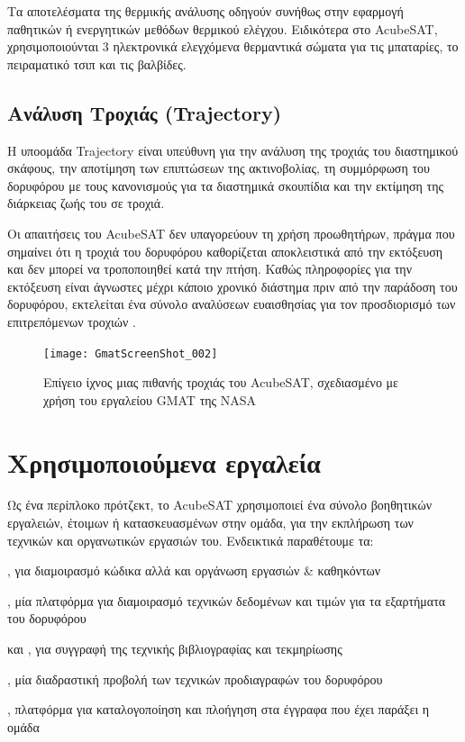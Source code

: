 \documentclass[a4paper,nobib]{tufte-book}
\begin{document}
Τα αποτελέσματα της θερμικής ανάλυσης οδηγούν συνήθως στην εφαρμογή παθητικών ή ενεργητικών μεθόδων θερμικού ελέγχου. Ειδικότερα στο AcubeSAT, χρησιμοποιούνται 3 ηλεκτρονικά ελεγχόμενα θερμαντικά σώματα για τις μπαταρίες, το πειραματικό τσιπ και τις βαλβίδες.

\subsection{Ανάλυση Τροχιάς (Trajectory)}

Η υποομάδα Trajectory είναι υπεύθυνη για την ανάλυση της τροχιάς του διαστημικού σκάφους, την αποτίμηση των επιπτώσεων της ακτινοβολίας, τη συμμόρφωση του δορυφόρου με τους κανονισμούς για τα διαστημικά σκουπίδια και την εκτίμηση της διάρκειας ζωής του σε τροχιά.

Οι απαιτήσεις του AcubeSAT δεν υπαγορεύουν τη χρήση προωθητήρων, πράγμα που σημαίνει ότι η τροχιά του δορυφόρου καθορίζεται αποκλειστικά από την εκτόξευση και δεν μπορεί να τροποποιηθεί κατά την πτήση. Καθώς πληροφορίες για την εκτόξευση είναι άγνωστες μέχρι κάποιο χρονικό διάστημα πριν από την παράδοση του δορυφόρου, εκτελείται ένα σύνολο αναλύσεων ευαισθησίας για τον προσδιορισμό των επιτρεπόμενων τροχιών \autocite{MDO,anthopoulos_orbital_analysis_2020}.
\begin{figure}
	\texttt{[image: GmatScreenShot\_002]}
	\caption[Επίγειο ίχνος μιας πιθανής τροχιάς του AcubeSAT]{Επίγειο ίχνος μιας πιθανής τροχιάς του AcubeSAT, σχεδιασμένο με χρήση του εργαλείου \acl{GMAT} της NASA}
	\label{fig:gmat}
\end{figure}


\section{Χρησιμοποιούμενα εργαλεία}

Ως ένα περίπλοκο πρότζεκτ, το AcubeSAT χρησιμοποιεί ένα σύνολο βοηθητικών εργαλειών, έτοιμων ή κατασκευασμένων στην ομάδα, για την εκπλήρωση των τεχνικών και οργανωτικών εργασιών του. Ενδεικτικά παραθέτουμε τα:
\begin{compactitem}
	\item {}, για διαμοιρασμό κώδικα αλλά και οργάνωση εργασιών \& καθηκόντων
	\item {}, μία πλατφόρμα για διαμοιρασμό τεχνικών δεδομένων και τιμών για τα εξαρτήματα του δορυφόρου
	\item  {} και , για συγγραφή της τεχνικής βιβλιογραφίας και τεκμηρίωσης
	\item {}, μία διαδραστική προβολή των τεχνικών προδιαγραφών του δορυφόρου
	\item {}, πλατφόρμα για καταλογοποίηση και πλοήγηση στα έγγραφα που έχει παράξει η ομάδα
\end{compactitem}
\end{document}
